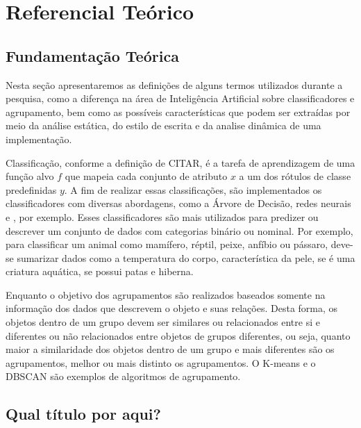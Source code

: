 \chapter{Referencial Teórico}

	\section{Fundamentação Teórica}
		Nesta seção apresentaremos as definições de alguns termos utilizados
		durante a pesquisa, como a diferença na área de Inteligência Artificial
		sobre classificadores e agrupamento, bem como as possíveis características
		que podem ser extraídas por meio da análise estática, do estilo de escrita
		e da analise dinâmica de uma implementação.
		
		Classificação, conforme a definição de CITAR, é a tarefa de aprendizagem
		de uma função alvo $f$ que mapeia cada conjunto de atributo $x$ a um dos
		rótulos de classe predefinidas $y$. A fim de realizar essas classificações,
		são implementados os classificadores com diversas abordagens, como a
		Árvore de Decisão, redes neurais e , por exemplo.
		Esses classificadores são mais utilizados para predizer ou descrever um conjunto
		de dados com categorias binário ou nominal. Por exemplo, para classificar um
		animal como mamífero, réptil, peixe, anfíbio ou pássaro, deve-se sumarizar dados
		como a temperatura do corpo, característica da pele, se é uma criatura aquática,
		se possui patas e hiberna.
		
		Enquanto o objetivo dos agrupamentos são realizados baseados somente na informação
		dos dados que descrevem o objeto e suas relações. Desta forma, os objetos dentro
		de um grupo devem ser similares ou relacionados entre si e diferentes ou não
		relacionados entre objetos de grupos diferentes, ou seja, quanto maior a similaridade
		dos objetos dentro de um grupo e mais diferentes são os agrupamentos, melhor ou mais
		distinto os agrupamentos. O K-means e o DBSCAN são exemplos de algoritmos de
		agrupamento.
		

	\section{Qual título por aqui?}
	
